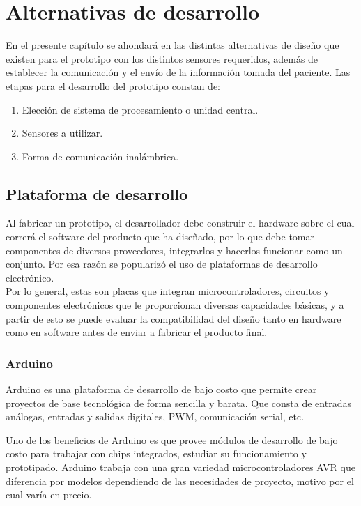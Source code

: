 \chapter{Alternativas de desarrollo}\label{alternativas}
En el presente capítulo se ahondará en las distintas alternativas de diseño que existen para el prototipo con los distintos sensores requeridos, además de establecer la comunicación y el envío de la información tomada del paciente. Las etapas para el desarrollo del prototipo constan de: 
\begin{enumerate}
	\item Elección de sistema de procesamiento o unidad central.
	\item Sensores a utilizar.
	\item Forma de comunicación inalámbrica.
\end{enumerate}

\section{Plataforma de desarrollo}\label{proce}
Al fabricar un prototipo, el desarrollador debe construir el hardware sobre el cual correrá el software del producto que ha diseñado, por lo que debe tomar componentes de diversos proveedores, integrarlos y hacerlos funcionar como un conjunto. Por esa razón se popularizó el uso de plataformas de desarrollo electrónico.  \\
Por lo general, estas son placas que integran microcontroladores, circuitos y componentes electrónicos que le proporcionan diversas capacidades básicas, y a partir de esto se puede evaluar la compatibilidad del diseño tanto en hardware como en software antes de enviar a fabricar el producto final. 

\newpage
\subsection{Arduino}
Arduino es una plataforma de desarrollo de bajo costo que permite crear proyectos de base tecnológica de forma sencilla y barata. Que consta de entradas análogas, entradas y salidas digitales, PWM, comunicación serial, etc. 

Uno de los beneficios de Arduino es que provee módulos de desarrollo de bajo costo para trabajar con chips integrados, estudiar su funcionamiento y prototipado.
Arduino trabaja con una gran variedad microcontroladores AVR que diferencia por modelos dependiendo de las necesidades de proyecto, motivo por el cual varía en precio. 

